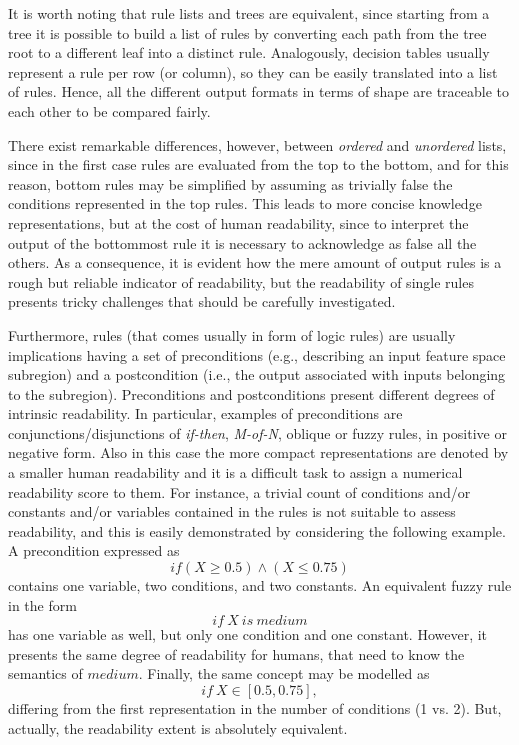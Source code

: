 \documentclass{article}
\begin{document}
It is worth noting that rule lists and trees are equivalent, since starting from a tree it is possible to build a list of rules by converting each path from the tree root to a different leaf into a distinct rule.
%
Analogously, decision tables usually represent a rule per row (or column), so they can be easily translated into a list of rules. 
%
Hence, all the different output formats in terms of shape are traceable to each other to be compared fairly.

There exist remarkable differences, however, between \emph{ordered} and \emph{unordered} lists, since in the first case rules are evaluated from the top to the bottom, and for this reason, bottom rules may be simplified by assuming as trivially false the conditions represented in the top rules.
%
This leads to more concise knowledge representations, but at the cost of human readability, since to interpret the output of the bottommost rule it is necessary to acknowledge as false all the others.
%
As a consequence, it is evident how the mere amount of output rules is a rough but reliable indicator of readability, but the readability of single rules presents tricky challenges that should be carefully investigated.

Furthermore, rules (that comes usually in form of logic rules) are usually implications having a set of preconditions (e.g., describing an input feature space subregion) and a postcondition (i.e., the output associated with inputs belonging to the subregion).
%
Preconditions and postconditions present different degrees of intrinsic readability.
%
In particular, examples of preconditions are {con\-junc\-tions}/disjunctions of \emph{if-then}, \emph{M-of-N}, oblique or fuzzy rules, in positive or negative form.
%
Also in this case the more compact representations are denoted by a smaller human readability and it is a difficult task to assign a numerical readability score to them.
%
For instance, a trivial count of conditions and/or constants and/or variables contained in the rules is not suitable to assess readability, and this is easily demonstrated by considering the following example.
%
A precondition expressed as
%
\begin{equation*}
	if (X \geq 0.5) \wedge (X \leq 0.75)
\end{equation*}
%
contains one variable, two conditions, and two constants.
%
An equivalent fuzzy rule in the form 
%
\begin{equation*}
	if~X~is~medium
\end{equation*}
%
has one variable as well, but only one condition and one constant.
%
However, it presents the same degree of readability for humans, that need to know the semantics of $medium$.
%
Finally, the same concept may be modelled as 
%
\begin{equation*}
	if~X \in [0.5, 0.75],
\end{equation*}
%
differing from the first representation in the number of conditions (1 vs. 2).
%
But, actually, the readability extent is absolutely equivalent.
\end{document}
